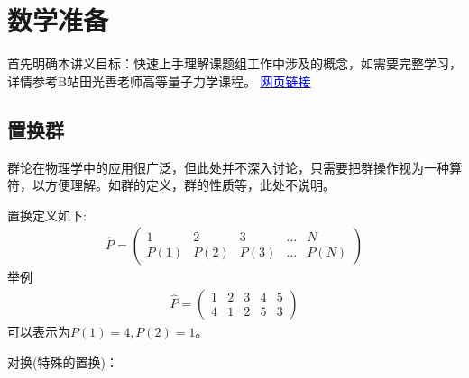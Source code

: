 \documentclass[12pt, a4paper, oneside, UTF8]{ctexbook}
\begin{document}
\section{数学准备}
首先明确本讲义目标：快速上手理解课题组工作中涉及的概念，如需要完整学习，详情参考B站田光善老师高等量子力学课程。
\href{https://www.bilibili.com/video/BV1qk4y1173i?p=1&vd_source=cd4587e54f9d57093a8dbe5712bb9c5e}
{\textcolor{blue}{网页链接}}

\subsection{置换群}
群论在物理学中的应用很广泛，但此处并不深入讨论，只需要把群操作视为一种算符，以方便理解。如群的定义，群的性质等，此处不说明。

置换定义如下:
\begin{align}
    \hat{P}=\left(\begin{matrix}
        1 & 2 & 3 & \dots & N\\
        P(1) & P(2) & P(3)&\dots&P(N)
    \end{matrix}\right)
\end{align}
举例
\begin{align}
    \hat{P}=\left(\begin{matrix}
        1&2&3&4&5\\
        4&1&2&5&3
    \end{matrix}\right)
\end{align}
可以表示为$P(1)=4,P(2)=1$。

对换(特殊的置换)：
\end{document}

